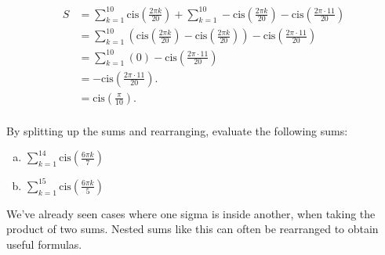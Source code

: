 \begin{align*}
S &= \sum_{k=1}^{10} \text{cis} \left(\frac{2\pi k}{20} \right)
+ \sum_{k=1}^{10} -\text{cis} \left(\frac{2\pi k}{20} \right) -
\text{cis} \left(\frac{2\pi \cdot 11}{20} \right) \\
&= \sum_{k=1}^{10} \left(\text{cis} \left(\frac{2\pi k}{20} \right)
 -\text{cis} \left(\frac{2\pi k}{20} \right) \right) -
\text{cis} \left(\frac{2\pi \cdot 11}{20} \right) \\
&= \sum_{k=1}^{10} (0) -
\text{cis} \left(\frac{2\pi \cdot 11}{20} \right) \\
&= -\text{cis} \left(\frac{2\pi \cdot 11}{20} \right). \\
&= \text{cis} \left(\frac{\pi }{10} \right). \\
\end{align*}

\begin{exercise}{}
By splitting up the sums and rearranging, evaluate the following sums:
\begin{enumerate}[(a)]
\item
$\sum_{k=1}^{14} \text{cis} \left(\frac{6\pi k}{7} \right)$
\item
$\sum_{k=1}^{15} \text{cis} \left(\frac{6\pi k}{5} \right)$
\end{enumerate}
\end{exercise}

We've already seen cases where one sigma is inside another, when taking the product of two sums. Nested sums like this can often be rearranged to obtain useful formulas.

